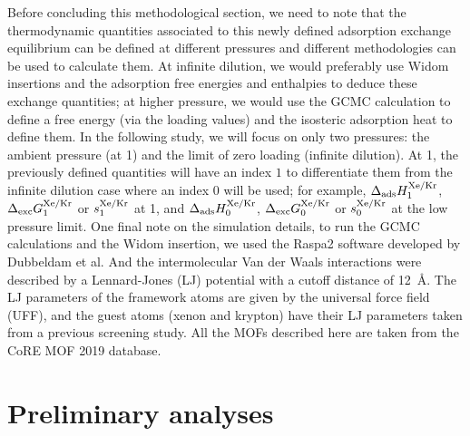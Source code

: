 \documentclass[main.tex]{subfiles}
\begin{document}
Before concluding this methodological section, we need to note that the thermodynamic quantities associated to this newly defined adsorption exchange equilibrium can be defined at different pressures and different methodologies can be used to calculate them. At infinite dilution, we would preferably use Widom insertions and the adsorption free energies and enthalpies to deduce these exchange quantities; at higher pressure, we would use the GCMC calculation to define a free energy (via the loading values) and the isosteric adsorption heat to define them. In the following study, we will focus on only two pressures: the ambient pressure (at \SI{1}{\atm}) and the limit of zero loading (infinite dilution). At \SI{1}{\atm}, the previously defined quantities will have an index $1$ to differentiate them from the infinite dilution case where an index $0$ will be used; for example, $\Delta_{\text{ads}}H_{\text{1}}^{\text{Xe/Kr}}$, $\Delta_{\text{exc}}G_{\text{1}}^{\text{Xe/Kr}}$ or $s_{\text{1}}^{\text{Xe/Kr}}$ at \SI{1}{\atm}, and $\Delta_{\text{ads}}H_{\text{0}}^{\text{Xe/Kr}}$, $\Delta_{\text{exc}}G_{\text{0}}^{\text{Xe/Kr}}$ or $s_{\text{0}}^{\text{Xe/Kr}}$ at the low pressure limit. One final note on the simulation details, to run the GCMC calculations and the Widom insertion, we used the Raspa2 software developed by Dubbeldam et al.\cite{dubbeldam2016} And the intermolecular Van der Waals interactions were described by a Lennard-Jones (LJ) potential with a cutoff distance of \SI{12}{\angstrom}. The LJ parameters of the framework atoms are given by the universal force field (UFF),\cite{rappe1992} and the guest atoms (xenon and krypton) have their LJ parameters taken from a previous screening study.\cite{Ryan_2010} All the MOFs described here are taken from the CoRE MOF 2019 database.\cite{Chung_2019}


\section{Preliminary analyses}
\end{document}
